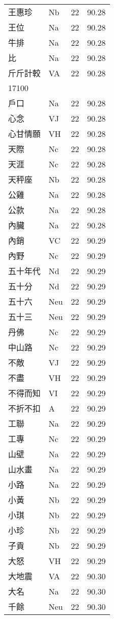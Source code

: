 \documentclass[twocolumn]{book}
\begin{document}
\begin{supertabular}{llrr}
王惠珍 & Nb & 22 &  90.28\\
王位 & Na & 22 &  90.28\\
牛排 & Na & 22 &  90.28\\
比 & Na & 22 &  90.28\\
斤斤計較 & VA & 22 &  90.28\\
17100\\
戶口 & Na & 22 &  90.28\\
心念 & VJ & 22 &  90.28\\
心甘情願 & VH & 22 &  90.28\\
天際 & Nc & 22 &  90.28\\
天涯 & Nc & 22 &  90.28\\
天秤座 & Nb & 22 &  90.28\\
公雞 & Na & 22 &  90.28\\
公款 & Na & 22 &  90.28\\
內臟 & Na & 22 &  90.28\\
內銷 & VC & 22 &  90.29\\
內野 & Nc & 22 &  90.29\\
五十年代 & Nd & 22 &  90.29\\
五十分 & Nd & 22 &  90.29\\
五十六 & Neu & 22 &  90.29\\
五十三 & Neu & 22 &  90.29\\
丹佛 & Nc & 22 &  90.29\\
中山路 & Nc & 22 &  90.29\\
不敵 & VJ & 22 &  90.29\\
不盡 & VH & 22 &  90.29\\
不得而知 & VI & 22 &  90.29\\
不折不扣 & A & 22 &  90.29\\
工聯 & Na & 22 &  90.29\\
工專 & Nc & 22 &  90.29\\
山壁 & Na & 22 &  90.29\\
山水畫 & Na & 22 &  90.29\\
小路 & Na & 22 &  90.29\\
小黃 & Nb & 22 &  90.29\\
小琪 & Nb & 22 &  90.29\\
小珍 & Nb & 22 &  90.29\\
子貢 & Nb & 22 &  90.29\\
大怒 & VH & 22 &  90.29\\
大地震 & VA & 22 &  90.30\\
大名 & Na & 22 &  90.30\\
千餘 & Neu & 22 &  90.30\\

\end{supertabular}
\end{document}

